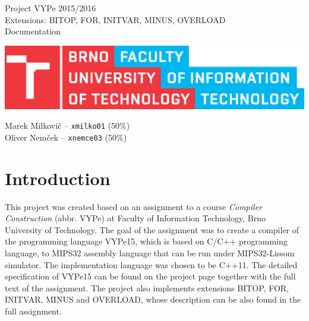 \documentclass[12pt]{article}
\begin{document}
\nocite{*}
\begin{titlepage}
	\begin{center}
		\noindent\LARGE{Project VYPe 2015/2016} \\
		\scriptsize{Extensions: BITOP, FOR, INITVAR, MINUS, OVERLOAD} \\
		\Large{Documentation}
	\end{center}
	\vfill
	\begin{center}
		\includegraphics[scale=0.7]{FIT_logo.eps}
	\end{center}
	\vfill
	Marek Milkovič -- \texttt{xmilko01} (50\%) \\
	Oliver Nemček -- \texttt{xnemce03} (50\%)
\end{titlepage}
\thispagestyle{empty}
\tableofcontents
\clearpage

\setcounter{page}{1}
\section{Introduction}
This project was created based on an assignment to a course \emph{Compiler Construction} (abbr. VYPe) at Faculty of Information Technology, Brno University of Technology.
The goal of the assignment was to create a compiler of the programming language VYPe15, which is based on C/C++ programming language,
to MIPS32 assembly language that can be run under MIPS32-Lissom simulator. The implementation language was chosen to be C++11.
The detailed specification of VYPe15 can be found
on the project page together with the full text of the assignment. The project also implements extensions BITOP, FOR, INITVAR, MINUS
and OVERLOAD, whose description can be also found in the full assignment.
\end{document}
